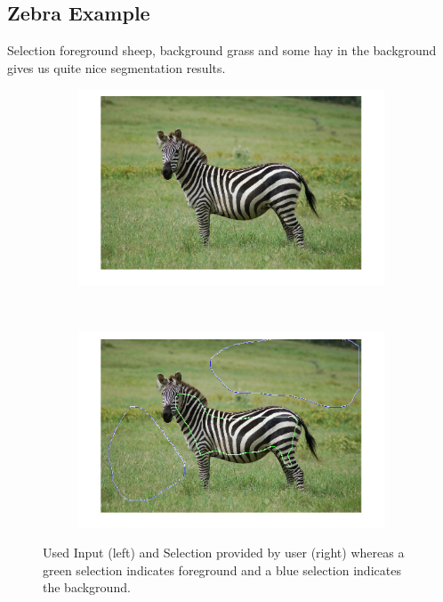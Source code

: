 \documentclass{paper}
\begin{document}
\subsection{Zebra Example}

Selection foreground sheep, background grass and some hay in the background gives us quite nice segmentation results.

\begin{figure}[H]
    \centering
    \begin{subfigure}{0.45\textwidth}
        \includegraphics[width=\textwidth]{../../outputs/p4/image_segmentation/zebra/gamma20/input}
    \end{subfigure}
    ~
        \begin{subfigure}{0.45\textwidth}
        \includegraphics[width=\textwidth]{../../outputs/p4/image_segmentation/zebra/gamma20/selection}
    \end{subfigure}
    
    \caption{Used Input (left) and Selection provided by user (right) whereas a green selection indicates foreground and a blue selection indicates the background.}
    \label{fig:segmentation_zebra_input_selection}       
\end{figure}
\end{document}
